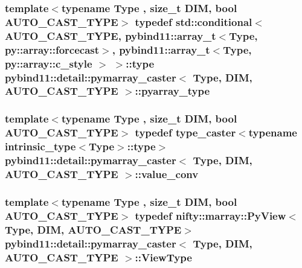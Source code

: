 \subsubsection[{pyarray\+\_\+type}]{\setlength{\rightskip}{0pt plus 5cm}template$<$typename Type , size\+\_\+t D\+I\+M, bool A\+U\+T\+O\+\_\+\+C\+A\+S\+T\+\_\+\+T\+Y\+P\+E$>$ typedef std\+::conditional$<$A\+U\+T\+O\+\_\+\+C\+A\+S\+T\+\_\+\+T\+Y\+P\+E, pybind11\+::array\+\_\+t$<$Type, py\+::array\+::forcecast$>$, pybind11\+::array\+\_\+t$<$Type, py\+::array\+::c\+\_\+style $>$ $>$\+::type {\bf pybind11\+::detail\+::pymarray\+\_\+caster}$<$ Type, D\+I\+M, A\+U\+T\+O\+\_\+\+C\+A\+S\+T\+\_\+\+T\+Y\+P\+E $>$\+::{\bf pyarray\+\_\+type}}\label{structpybind11_1_1detail_1_1pymarray__caster_a70ad611a7f6fd17d02b461c43dff6ea0}
\hypertarget{structpybind11_1_1detail_1_1pymarray__caster_aa57421c8e7e64ab62bac67897f864ea1}{}
\subsubsection[{value\+\_\+conv}]{\setlength{\rightskip}{0pt plus 5cm}template$<$typename Type , size\+\_\+t D\+I\+M, bool A\+U\+T\+O\+\_\+\+C\+A\+S\+T\+\_\+\+T\+Y\+P\+E$>$ typedef type\+\_\+caster$<$typename intrinsic\+\_\+type$<$Type$>$\+::type$>$ {\bf pybind11\+::detail\+::pymarray\+\_\+caster}$<$ Type, D\+I\+M, A\+U\+T\+O\+\_\+\+C\+A\+S\+T\+\_\+\+T\+Y\+P\+E $>$\+::{\bf value\+\_\+conv}}\label{structpybind11_1_1detail_1_1pymarray__caster_aa57421c8e7e64ab62bac67897f864ea1}
\hypertarget{structpybind11_1_1detail_1_1pymarray__caster_a0593b33c0ed08f1b25b34dbc3da1b01c}{}
\subsubsection[{View\+Type}]{\setlength{\rightskip}{0pt plus 5cm}template$<$typename Type , size\+\_\+t D\+I\+M, bool A\+U\+T\+O\+\_\+\+C\+A\+S\+T\+\_\+\+T\+Y\+P\+E$>$ typedef {\bf nifty\+::marray\+::\+Py\+View}$<$Type, D\+I\+M, A\+U\+T\+O\+\_\+\+C\+A\+S\+T\+\_\+\+T\+Y\+P\+E$>$ {\bf pybind11\+::detail\+::pymarray\+\_\+caster}$<$ Type, D\+I\+M, A\+U\+T\+O\+\_\+\+C\+A\+S\+T\+\_\+\+T\+Y\+P\+E $>$\+::{\bf View\+Type}}\label{structpybind11_1_1detail_1_1pymarray__caster_a0593b33c0ed08f1b25b34dbc3da1b01c}


